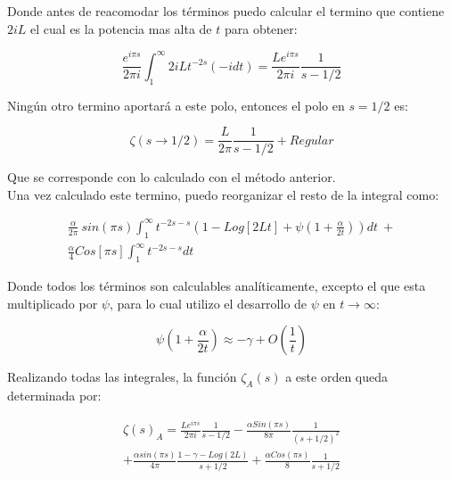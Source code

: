Donde antes de reacomodar los términos puedo calcular el termino que contiene $2iL$ el cual es la potencia mas alta de $t$ para obtener: 

\begin{equation}
    \frac{e^{i \pi s}}{2 \pi i }
    \int _1 ^{\infty}
    2 i L    
    t ^{-2 s}
    (-i dt) =  
    \frac{L e^{i \pi s} }{2 \pi i} \frac{1}{s-1/2   }
\end{equation}

Ningún otro termino aportará a este polo, entonces el polo en $s= 1/2$ es:

\begin{equation}
    \zeta  (s \rightarrow 1/2) = \frac{L}{2 \pi} \frac{1}{s- 1/2 } + Regular
\end{equation}

Que se corresponde con lo calculado con el método anterior. \\

Una vez calculado este termino, puedo reorganizar el resto de la integral como:

\begin{equation}
\begin{array}{c}
    \frac{\alpha}{2 \pi} \ sin(\pi s)
    \int _1 ^{\infty}
    t ^{-2 s-s} 
    \left(
    1 - Log[2Lt] + \psi (1 + \frac{\alpha}{2t})
    \right) dt \ + \\ 
    \frac{\alpha}{4} 
    Cos[\pi s]
    \int _1 ^{\infty} t^{-2s-s} dt
\end{array}
\end{equation}

Donde todos los términos son calculables analíticamente, excepto el que esta multiplicado por $\psi$, para lo cual utilizo el desarrollo de $\psi$ en $t \rightarrow \infty$:

\begin{equation}
    \psi(1 + \frac{\alpha}{2 t}) \approx 
    - \gamma + O \left( \frac{1}{t} \right)
\end{equation}

Realizando todas las integrales, la función $ \zeta _A (s)$ a este orden queda determinada por:  

\begin{equation}
\begin{array}{c}
    \zeta (s) _{A} = 
    \frac{L e ^{i \pi s}}{2 \pi i} \frac{1}{s-1/2} 
    -\frac{\alpha Sin(\pi s)}{8 \pi} \frac{1}{(s+1/2) ^2} \\
    + \frac{\alpha sin (\pi s) }{4 \pi } \frac{1 - \gamma -  Log(2 L)}{s+1/2}
    + \frac{\alpha Cos(\pi s)}{8} \frac{1}{s+1/2}
    
\end{array}
\end{equation}

